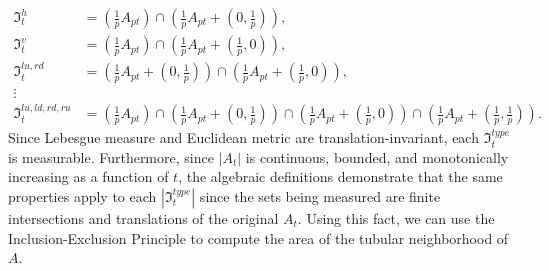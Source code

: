 \documentclass{article}
\theoremstyle{plain}
\numberwithin{equation}{section}
\numberwithin{table}{section}
\numberwithin{figure}{section}
\newcommand{\vaddspace}[1]{\rule{0pt}{#1pt}}
\newcommand{\newparagraph}{\vaddspace{10}}
\begin{document}
\begin{align}
\mathfrak{I}_t^{h} &= \left(\frac{1}{p} A_{pt}\right) \cap \left(\frac{1}{p} A_{pt} + \left(0,\frac{1}{p}\right)\right) \label{eq:intersectionh}, \\
\mathfrak{I}_t^{v} &= \left(\frac{1}{p} A_{pt}\right) \cap \left(\frac{1}{p} A_{pt} + \left(\frac{1}{p},0\right)\right), \\
\mathfrak{I}_t^{lu,rd} &= \left(\frac{1}{p} A_{pt} + \left(0,\frac{1}{p}\right)\right) \cap \left(\frac{1}{p} A_{pt} + \left(\frac{1}{p},0\right)\right), \\
\vdots\nonumber\\
\mathfrak{I}_t^{lu,ld,rd,ru} &= \left(\frac{1}{p} A_{pt}\right) \cap \left(\frac{1}{p} A_{pt} + \left(0,\frac{1}{p}\right)\right) \cap \left(\frac{1}{p} A_{pt} + \left(\frac{1}{p},0\right)\right) \cap \left(\frac{1}{p} A_{pt} + \left(\frac{1}{p},\frac{1}{p}\right)\right). \label{eq:intersection4way}
\end{align}
Since Lebesgue measure and Euclidean metric are translation-invariant, each $\mathfrak{I}_t^{type}$ is measurable. Furthermore, since $|A_t|$ is continuous, bounded, and monotonically increasing as a function of $t$, the algebraic definitions demonstrate that the same properties apply to each $\left|\mathfrak{I}_t^{type}\right|$ since the sets being measured are finite intersections and translations of the original $A_t$. Using this fact, we can use the Inclusion-Exclusion Principle to compute the area of the tubular neighborhood of $A$.
\newparagraph
\end{document}
